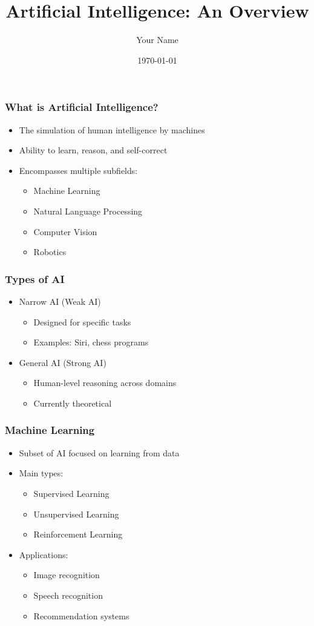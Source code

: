 \documentclass{beamer}
\title{Artificial Intelligence: An Overview}
\author{Your Name}
\date{\today}
\begin{document}
\frame{\titlepage}

\begin{frame}
\frametitle{What is Artificial Intelligence?}
\begin{itemize}
    \item The simulation of human intelligence by machines
    \item Ability to learn, reason, and self-correct
    \item Encompasses multiple subfields:
    \begin{itemize}
        \item Machine Learning
        \item Natural Language Processing
        \item Computer Vision
        \item Robotics
    \end{itemize}
\end{itemize}
\end{frame}

\begin{frame}
\frametitle{Types of AI}
\begin{itemize}
    \item Narrow AI (Weak AI)
    \begin{itemize}
        \item Designed for specific tasks
        \item Examples: Siri, chess programs
    \end{itemize}
    \item General AI (Strong AI)
    \begin{itemize}
        \item Human-level reasoning across domains
        \item Currently theoretical
    \end{itemize}
\end{itemize}
\end{frame}

\begin{frame}
\frametitle{Machine Learning}
\begin{itemize}
    \item Subset of AI focused on learning from data
    \item Main types:
    \begin{itemize}
        \item Supervised Learning
        \item Unsupervised Learning
        \item Reinforcement Learning
    \end{itemize}
    \item Applications:
    \begin{itemize}
        \item Image recognition
        \item Speech recognition
        \item Recommendation systems
    \end{itemize}
\end{itemize}
\end{frame}
\end{document}
